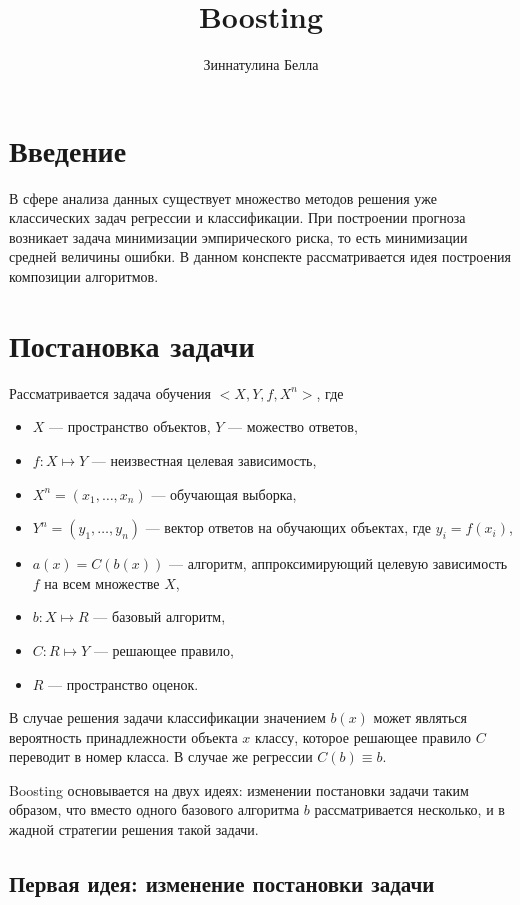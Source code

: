 \documentclass[specialist, 12pt, href]{article}
\title{Boosting}
\author{Зиннатулина Белла}
\date{}
\begin{document}
\maketitle



\section{Введение}

В сфере анализа данных существует множество методов решения уже классических задач регрессии и классификации.  
При построении прогноза возникает задача минимизации эмпирического риска, то есть минимизации средней величины ошибки. В данном конспекте рассматривается идея построения композиции алгоритмов. 

\section{Постановка задачи}

Рассматривается задача обучения $<X,Y, f, X^{n}>$, где  \begin{itemize}
 \item $X$ --- пространство объектов, $Y$ --- можество ответов,
 \item $f: X \mapsto Y$ --- неизвестная целевая зависимость,
 \item $X^{n} = (x_1,\dots,x_{n})$ --- обучающая выборка,
 \item $Y^{n} = (y_1,\dots, y_{n})$ --- вектор ответов на обучающих объектах, где $y_i = f(x_i)$,
 \item $a(x) = C(b(x))$ --- алгоритм, аппроксимирующий целевую зависимость $f$ на всем множестве $X$,
 \item $b:X \mapsto R$ --- базовый алгоритм,
 \item $C:R \mapsto Y$ --- решающее правило,
 \item $R$ --- пространство оценок.
 \end{itemize}

В случае решения задачи классификации значением $b(x)$ может являться вероятность принадлежности объекта $x$ классу, которое решающее правило $C$ переводит в номер класса. В случае же регрессии $C(b) \equiv b$.

Boosting основывается на двух идеях: изменении постановки задачи таким образом, что вместо одного базового алгоритма $b$ рассматривается несколько, и в жадной стратегии решения такой задачи.

\subsection*{Первая идея: изменение постановки задачи}
 
\end{document}
